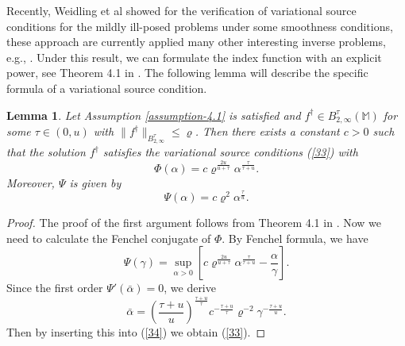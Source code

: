 \documentclass[10pt]{iopart}
\newtheorem{lemma}[theorem]{Lemma}
\begin{document}
Recently, Weidling et al \cite{Weidling2018} showed for the verification of variational source conditions for the mildly ill-posed problems under some smoothness conditions, these approach are 
currently applied many other interesting inverse problems, e.g., \cite{Hohage2017, Hohage2019, Weidling2017}. Under this result, we can formulate the index function with an explicit power, see Theorem 4.1 in \cite{Weidling2018}. The following lemma will describe the specific formula of a variational source condition.

\begin{lemma}\label{Lemma-4.3}
Let Assumption \ref{assumption-4.1} is satisfied and $f^{\dagger}\in B_{2,\infty}^{\tau}(\mathbb{M})$ for some $\tau\in (0, u)$ with
$\|f^{\dagger}\|_{B_{2, \infty}^{\tau}}\leq \varrho$. Then there exists a constant $c>0$ such that the solution $f^{\dagger}$ satisfies
the variational source conditions (\ref{33}) with 
\begin{equation*}
\Phi(\alpha)=c\varrho^{\frac{2u}{u+\tau}}\alpha^{\frac{\tau}{\tau+u}}.
\end{equation*}
Moreover, $\Psi$ is given by
\begin{equation}\label{33}
\Psi(\alpha)=c\varrho^{2}\alpha^{\frac{\tau}{u}}.
\end{equation}
\end{lemma}

\begin{proof}
The proof of the first argument follows from Theorem 4.1 in \cite{Weidling2018}. Now we need to calculate the Fenchel conjugate of $\Phi$.
By Fenchel formula, we have
\begin{equation}\label{34}
\Psi(\gamma)=\sup_{\alpha>0}\left[c\varrho^{\frac{2u}{u+\tau}}\alpha^{\frac{\tau}{\tau+u}}-\frac{\alpha}{\gamma}\right].
\end{equation}
Since the first order $\Psi'(\bar{\alpha})=0$, we derive 
\begin{equation*}
\bar{\alpha}=\left(\frac{\tau+u}{u}\right)^{\frac{\tau+u}{\tau}}c^{-\frac{\tau+u}{\tau}}\varrho^{-2}\gamma^{-\frac{\tau+u}{u}}.
\end{equation*}
Then by inserting this into (\ref{34}) we obtain (\ref{33}).
\end{proof}
\end{document}
